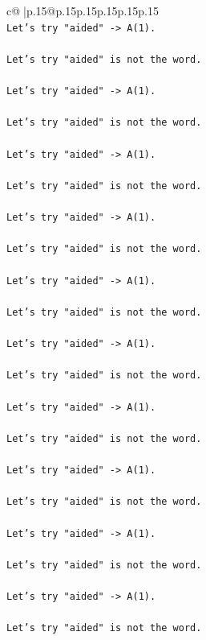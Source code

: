 \documentclass{article}
\begin{document}
{\begin{supertabular}{c@{$\;$}|p{.15\linewidth}@{}p{.15\linewidth}p{.15\linewidth}p{.15\linewidth}p{.15\linewidth}p{.15\linewidth}}
{{{\\ 
\texttt{Let's try "aided" {-}> A(1).} \\
\\ 
\texttt{Let's try "aided" is not the word.} \\
\\ 
\texttt{Let's try "aided" {-}> A(1).} \\
\\ 
\texttt{Let's try "aided" is not the word.} \\
\\ 
\texttt{Let's try "aided" {-}> A(1).} \\
\\ 
\texttt{Let's try "aided" is not the word.} \\
\\ 
\texttt{Let's try "aided" {-}> A(1).} \\
\\ 
\texttt{Let's try "aided" is not the word.} \\
\\ 
\texttt{Let's try "aided" {-}> A(1).} \\
\\ 
\texttt{Let's try "aided" is not the word.} \\
\\ 
\texttt{Let's try "aided" {-}> A(1).} \\
\\ 
\texttt{Let's try "aided" is not the word.} \\
\\ 
\texttt{Let's try "aided" {-}> A(1).} \\
\\ 
\texttt{Let's try "aided" is not the word.} \\
\\ 
\texttt{Let's try "aided" {-}> A(1).} \\
\\ 
\texttt{Let's try "aided" is not the word.} \\
\\ 
\texttt{Let's try "aided" {-}> A(1).} \\
\\ 
\texttt{Let's try "aided" is not the word.} \\
\\ 
\texttt{Let's try "aided" {-}> A(1).} \\
\\ 
\texttt{Let's try "aided" is not the word.} \\
\\ 
}}}
\end{supertabular}}
\end{document}
